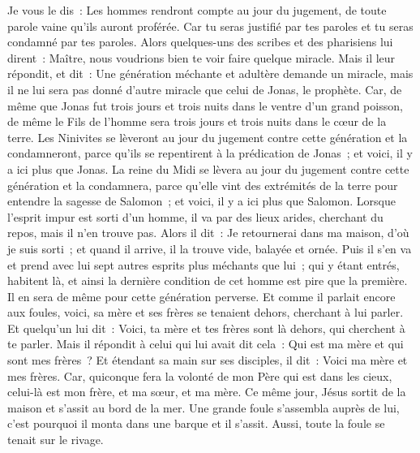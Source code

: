 \begin{multicols}{2}
Je vous le dis~: Les hommes rendront compte au jour du jugement, de toute parole vaine qu'ils auront proférée.
Car tu seras justifié par tes paroles et tu seras condamné par tes paroles.
Alors quelques-uns des scribes et des pharisiens lui dirent~: Maître, nous voudrions bien te voir faire quelque miracle.
Mais il leur répondit, et dit~: Une génération méchante et adultère demande un miracle, mais il ne lui sera pas donné d'autre miracle que celui de Jonas, le prophète.
Car, de même que Jonas fut trois jours et trois nuits dans le ventre d'un grand poisson, de même le Fils de l'homme sera trois jours et trois nuits dans le cœur de la terre.
Les Ninivites se lèveront au jour du jugement contre cette génération et la condamneront, parce qu'ils se repentirent à la prédication de Jonas~; et voici, il y a ici plus que Jonas.
La reine du Midi se lèvera au jour du jugement contre cette génération et la condamnera, parce qu'elle vint des extrémités de la terre pour entendre la sagesse de Salomon~; et voici, il y a ici plus que Salomon.
Lorsque l'esprit impur est sorti d'un homme, il va par des lieux arides, cherchant du repos, mais il n'en trouve pas.
Alors il dit~: Je retournerai dans ma maison, d'où je suis sorti~; et quand il arrive, il la trouve vide, balayée et ornée.
Puis il s'en va et prend avec lui sept autres esprits plus méchants que lui~; qui y étant entrés, habitent là, et ainsi la dernière condition de cet homme est pire que la première. Il en sera de même pour cette génération perverse.
Et comme il parlait encore aux foules, voici, sa mère et ses frères se tenaient dehors, cherchant à lui parler.
Et quelqu'un lui dit~: Voici, ta mère et tes frères sont là dehors, qui cherchent à te parler.
Mais il répondit à celui qui lui avait dit cela~: Qui est ma mère et qui sont mes frères~?
Et étendant sa main sur ses disciples, il dit~: Voici ma mère et mes frères.
Car, quiconque fera la volonté de mon Père qui est dans les cieux, celui-là est mon frère, et ma sœur, et ma mère.
\VerseOne{}Ce même jour, Jésus sortit de la maison et s'assit au bord de la mer.
Une grande foule s'assembla auprès de lui, c'est pourquoi il monta dans une barque et il s'assit. Aussi, toute la foule se tenait sur le rivage.

\end{multicols}
